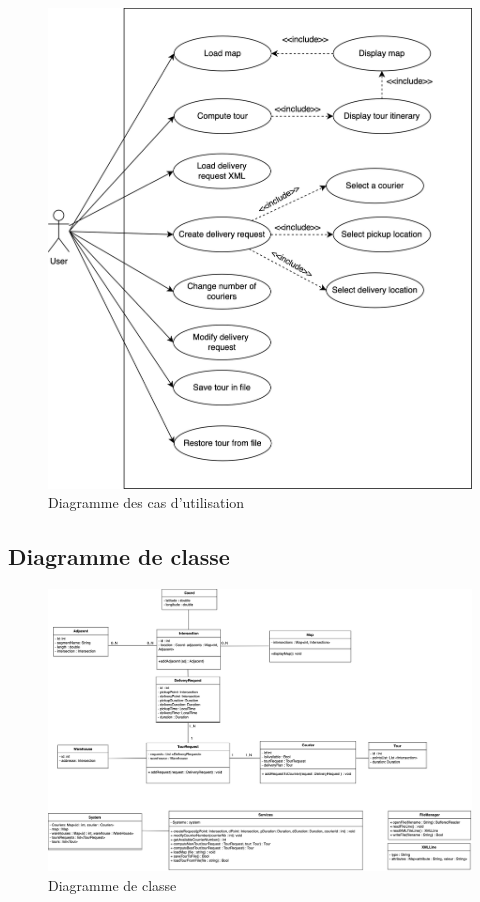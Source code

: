 \documentclass[a4paper]{article}
\begin{document}
\begin{figure}[H]
    \centering
    \includegraphics[width=0.75\linewidth]{images/usercase.png}
    \caption{Diagramme des cas d'utilisation}
\end{figure}


\subsection{Diagramme de classe}

\begin{figure}[H]
    \centering
    \includegraphics[width=1.2\linewidth, angle=270]{images/class.png}
    \caption{Diagramme de classe}
\end{figure}
\end{document}
